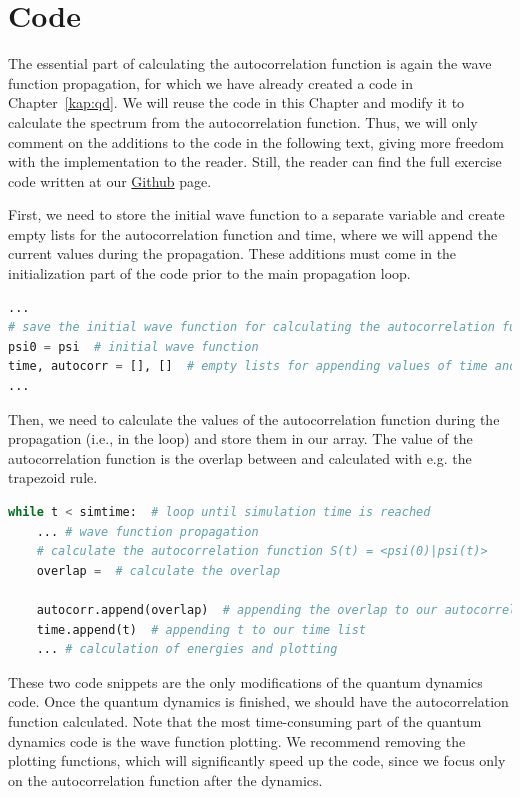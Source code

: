 \section{Code}

The essential part of calculating the autocorrelation function is again the wave function propagation, for which we have already created a code in Chapter~\ref{kap:qd}. We will reuse the code in this Chapter and modify it to calculate the spectrum from the autocorrelation function. Thus, we will only comment on the additions to the code in the following text, giving more freedom with the implementation to the reader. Still, the reader can find the full exercise code written at our \href{https://github.com/PHOTOX/QM-hands-on/blob/main/codes/exercises/autocorr.py}{Github} page.

First, we need to store the initial wave function to a separate variable and create empty lists for the autocorrelation function and time, where we will append the current values during the propagation. These additions must come in the initialization part of the code prior to the main propagation loop.
\begin{lstlisting}[language=Python, style=mystyle2]
...
# save the initial wave function for calculating the autocorrelation function
psi0 = psi  # initial wave function
time, autocorr = [], []  # empty lists for appending values of time and autocorrelation function
...
\end{lstlisting}

Then, we need to calculate the values of the autocorrelation function during the propagation (i.e., in the  loop) and store them in our array. The value of the autocorrelation function is the overlap between  and  calculated with e.g. the trapezoid rule.
\begin{lstlisting}[language=Python, style=mystyle2]
while t < simtime:  # loop until simulation time is reached
    ... # wave function propagation
    # calculate the autocorrelation function S(t) = <psi(0)|psi(t)>
    overlap =  # calculate the overlap

    autocorr.append(overlap)  # appending the overlap to our autocorrelation function list
    time.append(t)  # appending t to our time list
    ... # calculation of energies and plotting
\end{lstlisting}

These two code snippets are the only modifications of the quantum dynamics code. Once the quantum dynamics is finished, we should have the autocorrelation function calculated. Note that the most time-consuming part of the quantum dynamics code is the wave function plotting. We recommend removing the plotting functions, which will significantly speed up the code, since we focus only on the autocorrelation function after the dynamics.

